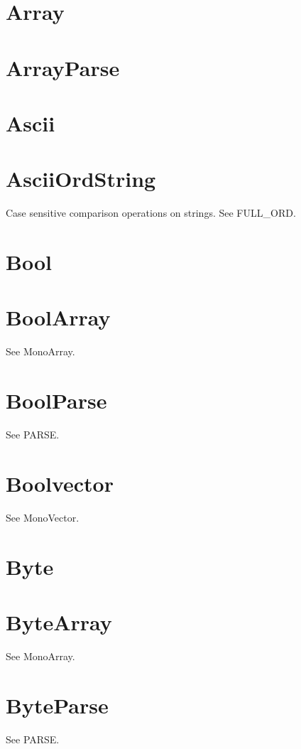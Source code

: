\section{Array}


\newpage
\section{ArrayParse}


\newpage
\section{Ascii}


\newpage
\section{AsciiOrdString}
Case sensitive comparison operations on strings. See FULL\_ORD.

\newpage
\section{Bool}


\newpage
\section{BoolArray}
See MonoArray.

\section{BoolParse}
See PARSE.

\section{Boolvector}
See MonoVector.

\newpage
\section{Byte}


\newpage
\section{ByteArray}
See MonoArray.

\section{ByteParse}
See PARSE.

